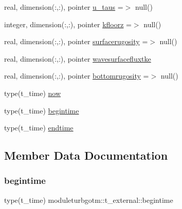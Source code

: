 \begin{DoxyCompactItemize}
\item 
real, dimension(\+:,\+:), pointer \mbox{\hyperlink{structmoduleturbgotm_1_1t__external_a5e4a6ff3c1bee54e462331d5930fe70f}{u\+\_\+taus}} =$>$ null()
\item 
integer, dimension(\+:,\+:), pointer \mbox{\hyperlink{structmoduleturbgotm_1_1t__external_a7bd5abf77296bdace5e368296a9e28be}{kfloorz}} =$>$ null()
\item 
real, dimension(\+:,\+:), pointer \mbox{\hyperlink{structmoduleturbgotm_1_1t__external_a5a1e05c390b32faaf5de4e9d820f4902}{surfacerugosity}} =$>$ null()
\item 
real, dimension(\+:,\+:), pointer \mbox{\hyperlink{structmoduleturbgotm_1_1t__external_a7e354db28ef0073d579d1d2210d46b5a}{wavesurfacefluxtke}}
\item 
real, dimension(\+:,\+:), pointer \mbox{\hyperlink{structmoduleturbgotm_1_1t__external_a3dcba4dcc7cc9b8bb2dd4dc99c10238b}{bottomrugosity}} =$>$ null()
\item 
type(t\+\_\+time) \mbox{\hyperlink{structmoduleturbgotm_1_1t__external_a0579457ac9162ccee9bbac7a42aa2fd3}{now}}
\item 
type(t\+\_\+time) \mbox{\hyperlink{structmoduleturbgotm_1_1t__external_af4f970294d9156f672ff233153aacd12}{begintime}}
\item 
type(t\+\_\+time) \mbox{\hyperlink{structmoduleturbgotm_1_1t__external_a6d3b5d0a41de7e53fe74c43ccdb6f593}{endtime}}
\end{DoxyCompactItemize}


\subsection{Member Data Documentation}
\mbox{\label{structmoduleturbgotm_1_1t__external_af4f970294d9156f672ff233153aacd12}} 
\subsubsection{\texorpdfstring{begintime}{begintime}}
{\footnotesize\ttfamily type(t\+\_\+time) moduleturbgotm\+::t\+\_\+external\+::begintime\hspace{0.3cm}{\ttfamily [private]}}

\mbox{\label{structmoduleturbgotm_1_1t__external_a3dcba4dcc7cc9b8bb2dd4dc99c10238b}} 
